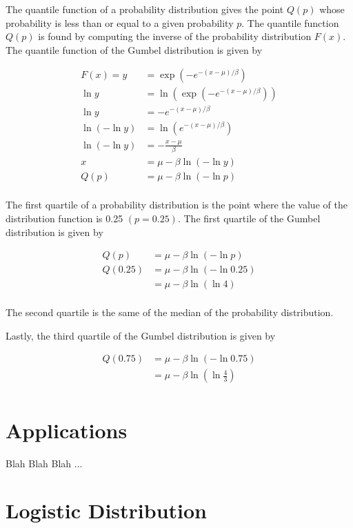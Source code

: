 \documentclass[titlepage,12 pt]{article}
\begin{document}
The quantile function of a probability distribution gives the point $Q(p)$ whose probability is less than or equal to a given probability $p$. The quantile function $Q(p)$ is found by computing the inverse of the probability distribution $F(x)$. The quantile function of the Gumbel distribution is given by

\begin{align*}
F(x)=y&=\exp\left( -e^{-(x-\mu)/\beta} \right) \\
\ln{y}&=\ln{\left(\exp\left( -e^{-(x-\mu)/\beta} \right)\right)} \\[3mm]
\ln{y}&=-e^{-(x-\mu)/\beta} \\[3mm]
\ln(-\ln{y})&=\ln{\left(e^{-(x-\mu)/\beta}\right)} \\[3mm]
\ln(-\ln{y})&=-\frac{x-\mu}{\beta} \\[2mm]
x&=\mu-\beta\ln{(-\ln{y})} \\[2mm]
Q(p)&=\mu-\beta\ln{(-\ln{p})} \\
\end{align*}

The first quartile of a probability distribution is the point where the value of the distribution function is 0.25 $(p=0.25)$. The first quartile of the Gumbel distribution is given by

\begin{align*}
Q(p)&=\mu-\beta\ln{(-\ln{p})} \\
Q(0.25)&=\mu-\beta\ln{(-\ln{0.25})} \\
&=\mu-\beta\ln{(\ln{4})} \\
\end{align*}

The second quartile is the same of the median of the probability distribution.

Lastly, the third quartile of the Gumbel distribution is given by

\begin{align*}
Q(0.75)&=\mu-\beta\ln{(-\ln{0.75})} \\
&=\mu-\beta\ln{\left(\ln{\frac{4}{3}}\right)} \\
\end{align*}


\section{Applications}

Blah Blah Blah ...

\section{Logistic Distribution}
\end{document}
